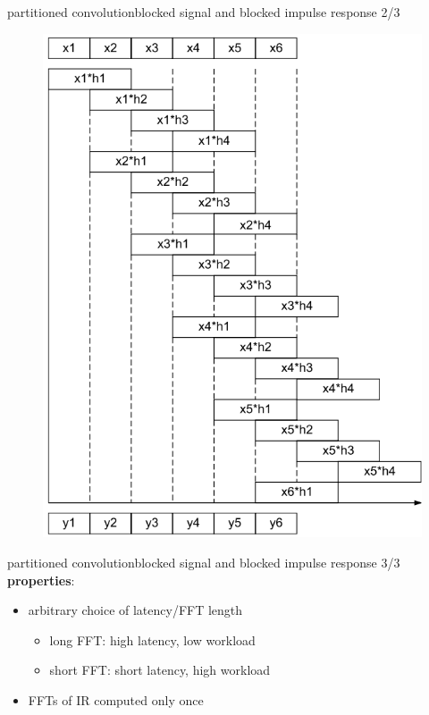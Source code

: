 \begin{frame}{partitioned convolution}{blocked signal and blocked impulse response 2/3}
	\vspace{-5mm}
    \begin{figure}
		\centering
			\includegraphics[scale=.35]{graph/conv_fast2}
	\end{figure}
\end{frame}

\begin{frame}{partitioned convolution}{blocked signal and blocked impulse response 3/3}
	\textbf{properties}:
	\begin{itemize}
		\item	arbitrary choice of latency/FFT length 
			\begin{itemize}
				\item	long FFT: high latency, low workload
				\item	short FFT: short latency, high workload
			\end{itemize}
		\item	FFTs of IR computed only once
	\end{itemize}
\end{frame}

